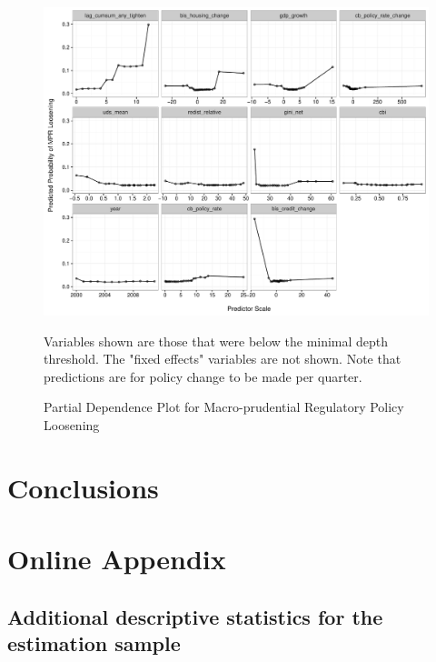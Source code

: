 \documentclass[]{article}
\begin{document}
\begin{figure}
    \caption{Partial Dependence Plot for Macro-prudential Regulatory Policy Loosening}
    \label{partial_loosen}
    \begin{center}
        \includegraphics{figures/patial_loosen.pdf}
    \end{center}

    {\scriptsize{Variables shown are those that were below the minimal depth threshold. The "fixed effects" variables are not shown. Note that predictions are for policy change to be made per quarter.}}

\end{figure}

\section{Conclusions}\label{conclusions}

\pagebreak
\renewcommand{\thepage}{A-\arabic{page}}\setcounter{page}{1}
\renewcommand{\thesection}{Appendix \arabic{section}}\setcounter{section}{0}
\renewcommand{\thetable}{A-\arabic{table}}\setcounter{table}{0}
\renewcommand{\thefigure}{A-\arabic{figure}}\setcounter{figure}{0}
\clearpage

\section{Online Appendix}\label{online-appendix}

\subsection{Additional descriptive statistics for the estimation
sample}\label{additional-descriptive-statistics-for-the-estimation-sample}
\end{document}
